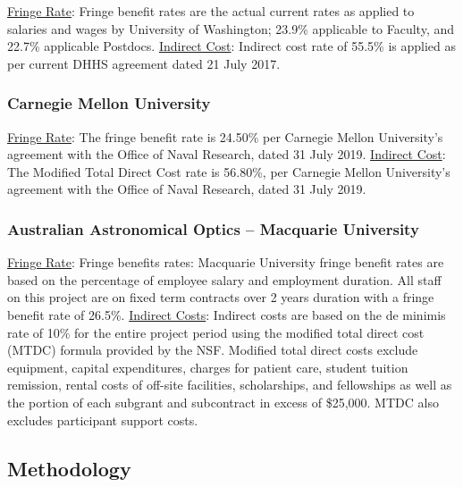 \documentclass[oneside,11pt]{amsart}
\begin{document}
\underline{Fringe Rate}: Fringe benefit rates are the actual current
rates as applied to salaries and wages by University of Washington;
23.9\% applicable to Faculty, and 22.7\% applicable Postdocs.
\underline{Indirect Cost}: Indirect cost rate of 55.5\% is applied as
per current DHHS agreement dated 21 July 2017.

\subsubsection{Carnegie Mellon University}

\underline{Fringe Rate}: The fringe benefit rate is 24.50\% per
Carnegie Mellon University's agreement with the Office of Naval
Research, dated 31 July 2019. \underline{Indirect Cost}: The Modified
Total Direct Cost rate is 56.80\%, per Carnegie Mellon University's
agreement with the Office of Naval Research, dated 31 July 2019.

\subsubsection{Australian Astronomical Optics -- Macquarie University}

\underline{Fringe Rate}: Fringe benefits rates: Macquarie University
fringe benefit rates are based on the percentage of employee salary
and employment duration. All staff on this project are on fixed term
contracts over 2 years duration with a fringe benefit rate of 26.5\%.
\underline{Indirect Costs}: Indirect costs are based on the de
minimis rate of 10\% for the entire project period using the modified
total direct cost (MTDC) formula provided by the NSF. Modified total
direct costs exclude equipment, capital expenditures, charges for
patient care, student tuition remission, rental costs of off-site
facilities, scholarships, and fellowships as well as the portion of
each subgrant and subcontract in excess of \$25,000. MTDC also
excludes participant support costs.



\subsection{Methodology}
\end{document}
